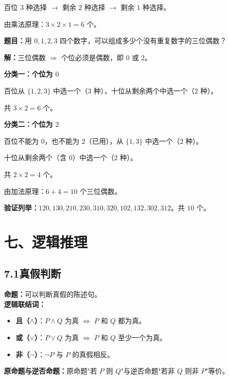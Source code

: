 \documentclass[12pt, a4paper]{ctexart}
\begin{document}
百位 $3$ 种选择 $\to$ 剩余 $2$ 种选择 $\to$ 剩余 $1$ 种选择。

由乘法原理：$3\times 2\times 1=\boxed{6}$ 个。

\begin{examplebox}[【例17】计数中的不重不漏]
\textbf{题目：}用 $0,1,2,3$ 四个数字，可以组成多少个没有重复数字的三位偶数？
\end{examplebox}

\textbf{解：}\;三位偶数 $\Rightarrow$ 个位必须是偶数，即 $0$ 或 $2$。

\textbf{分类一：个位为 $0$}

百位从 $\{1,2,3\}$ 中选一个（$3$ 种），十位从剩余两个中选一个（$2$ 种）。

共 $3\times 2=6$ 个。

\textbf{分类二：个位为 $2$}

百位不能为 $0$，也不能为 $2$（已用），从 $\{1,3\}$ 中选一个（$2$ 种）。

十位从剩余两个（含 $0$）中选一个（$2$ 种）。

共 $2\times 2=4$ 个。

由加法原理：$6+4=\boxed{10}$ 个三位偶数。

\textbf{验证列举：}$120, 130, 210, 230, 310, 320, 102, 132, 302, 312$。共 $10$ 个。\checkmark

\newpage
\section*{\textcolor{mainblue}{七、逻辑推理}}

\subsection*{7.1\quad 真假判断}

\begin{knowledgebox}[命题与逻辑]
\textbf{命题：}可以判断真假的陈述句。\\[4pt]
\textbf{逻辑联结词：}
\begin{itemize}[itemsep=1pt]
  \item \textbf{且（$\land$）}：$P\land Q$ 为真 $\Leftrightarrow$ $P$ 和 $Q$ 都为真。
  \item \textbf{或（$\lor$）}：$P\lor Q$ 为真 $\Leftrightarrow$ $P$ 和 $Q$ 至少一个为真。
  \item \textbf{非（$\neg$）}：$\neg P$ 与 $P$ 的真假相反。
\end{itemize}
\textbf{原命题与逆否命题：}原命题"若 $P$ 则 $Q$"与逆否命题"若非 $Q$ 则非 $P$"等价。
\end{knowledgebox}
\end{document}
